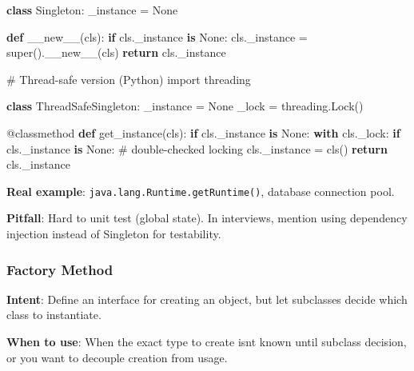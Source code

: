 \documentclass[11pt]{article}
\newenvironment{Shaded}{\begin{snugshade}}{\end{snugshade}}
\newcommand{\AttributeTok}[1]{\textcolor[rgb]{0.16,0.50,0.73}{#1}}
\newcommand{\BuiltInTok}[1]{\textcolor[rgb]{0.50,0.55,0.55}{#1}}
\newcommand{\CommentTok}[1]{\textcolor[rgb]{0.48,0.49,0.49}{#1}}
\newcommand{\ControlFlowTok}[1]{\textcolor[rgb]{0.99,0.74,0.29}{\textbf{#1}}}
\newcommand{\FunctionTok}[1]{\textcolor[rgb]{0.56,0.27,0.68}{#1}}
\newcommand{\ImportTok}[1]{\textcolor[rgb]{0.15,0.68,0.38}{#1}}
\newcommand{\KeywordTok}[1]{\textcolor[rgb]{0.81,0.81,0.76}{\textbf{#1}}}
\newcommand{\NormalTok}[1]{\textcolor[rgb]{0.81,0.81,0.76}{#1}}
\newcommand{\OperatorTok}[1]{\textcolor[rgb]{0.81,0.81,0.76}{#1}}
\newcommand{\VariableTok}[1]{\textcolor[rgb]{0.15,0.68,0.68}{#1}}
\begin{document}
\begin{Shaded}
\begin{Highlighting}[]
\KeywordTok{class}\NormalTok{ Singleton:}
\NormalTok{    \_instance }\OperatorTok{=} \VariableTok{None}

    \KeywordTok{def} \FunctionTok{\_\_new\_\_}\NormalTok{(cls):}
        \ControlFlowTok{if}\NormalTok{ cls.\_instance }\KeywordTok{is} \VariableTok{None}\NormalTok{:}
\NormalTok{            cls.\_instance }\OperatorTok{=} \BuiltInTok{super}\NormalTok{().}\FunctionTok{\_\_new\_\_}\NormalTok{(cls)}
        \ControlFlowTok{return}\NormalTok{ cls.\_instance}

\CommentTok{\# Thread{-}safe version (Python)}
\ImportTok{import}\NormalTok{ threading}

\KeywordTok{class}\NormalTok{ ThreadSafeSingleton:}
\NormalTok{    \_instance }\OperatorTok{=} \VariableTok{None}
\NormalTok{    \_lock }\OperatorTok{=}\NormalTok{ threading.Lock()}

    \AttributeTok{@classmethod}
    \KeywordTok{def}\NormalTok{ get\_instance(cls):}
        \ControlFlowTok{if}\NormalTok{ cls.\_instance }\KeywordTok{is} \VariableTok{None}\NormalTok{:}
            \ControlFlowTok{with}\NormalTok{ cls.\_lock:}
                \ControlFlowTok{if}\NormalTok{ cls.\_instance }\KeywordTok{is} \VariableTok{None}\NormalTok{:       }\CommentTok{\# double{-}checked locking}
\NormalTok{                    cls.\_instance }\OperatorTok{=}\NormalTok{ cls()}
        \ControlFlowTok{return}\NormalTok{ cls.\_instance}
\end{Highlighting}
\end{Shaded}

\textbf{Real example}: \texttt{java.lang.Runtime.getRuntime()}, database connection pool.

\textbf{Pitfall}: Hard to unit test (global state). In interviews, mention using dependency injection instead of Singleton for testability.

\subsubsection{Factory Method}\label{factory-method}

\textbf{Intent}: Define an interface for creating an object, but let subclasses decide which class to instantiate.

\textbf{When to use}: When the exact type to create isn\textquotesingle t known until subclass decision, or you want to decouple creation from usage.
\end{document}

